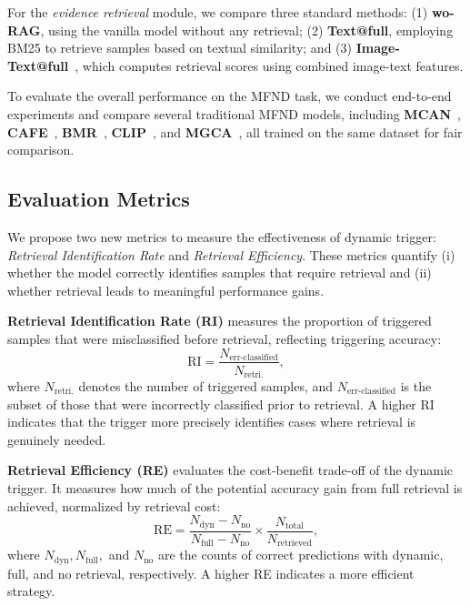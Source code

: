 For the \textit{evidence retrieval} module, we compare three standard methods: (1) \textbf{wo-RAG}, using the vanilla model without any retrieval; (2) \textbf{Text@full}, employing BM25 to retrieve samples based on textual similarity; and (3) \textbf{Image-Text@full}~\cite{tang2024leveraging}, which computes retrieval scores using combined image-text features.

To evaluate the overall performance on the MFND task, we conduct end-to-end experiments and compare several traditional MFND models, including \textbf{MCAN}~\cite{wu-mcan}, \textbf{CAFE}~\cite{62chencafe}, \textbf{BMR}~\cite{yingbmr}, \textbf{CLIP}~\cite{radfordclip}, and \textbf{MGCA}~\cite{guo2025each}, all trained on the same dataset for fair comparison.


\vspace{-1mm}
\subsection{Evaluation Metrics}
We propose two new metrics to measure the effectiveness of dynamic trigger: \textit{Retrieval Identification Rate} and \textit{Retrieval Efficiency}. These metrics quantify (i) whether the model correctly identifies samples that require retrieval and (ii) whether retrieval leads to meaningful performance gains.

\noindent\textbf{Retrieval Identification Rate (RI)} measures the proportion of triggered samples that were misclassified before retrieval, reflecting triggering accuracy:
    \begin{equation}
        \text{RI} = \frac{N_{\text{err-classified}}}{N_{\text{retri.}}},
    \end{equation}
where $N_{\text{retri.}}$ denotes the number of triggered samples, and $N_{\text{err-classified}}$ is the subset of those that were incorrectly classified prior to retrieval. A higher RI indicates that the trigger more precisely identifies cases where retrieval is genuinely needed.
    
\noindent\textbf{Retrieval Efficiency (RE)} evaluates the cost-benefit trade-off of the dynamic trigger. It measures how much of the potential accuracy gain from full retrieval is achieved, normalized by retrieval cost:
\begin{equation}
\label{eq:re}
    \text{RE} = \frac{N_{\text{dyn}} - N_{\text{no}}}{N_{\text{full}} - N_{\text{no}}} \times \frac{N_{\text{total}}}{N_{\text{retrieved}}},
\end{equation}
where $N_{\text{dyn}}, N_{\text{full}},$ and $N_{\text{no}}$ are the counts of correct predictions with dynamic, full, and no retrieval, respectively. A higher RE indicates a more efficient strategy.


